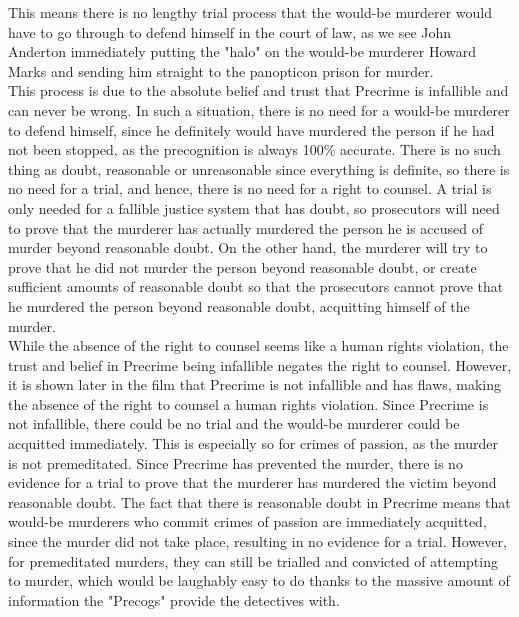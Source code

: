 \documentclass[11pt]{article}
\begin{document}
 \newpage

This means there is no lengthy trial process that the
would-be murderer would have to go through to defend himself
in the court of law, as we see John Anderton immediately putting
the "halo" on the would-be murderer Howard Marks and sending
him straight to the panopticon prison for murder.  \\

This process is due to the absolute belief and trust that Precrime
is infallible and can never be wrong. In such a situation, there
is no need for a would-be murderer to defend himself, since he
definitely would have murdered the person if he had not been stopped,
as the precognition is always 100\% accurate. There is no such thing
as doubt, reasonable or unreasonable since everything is definite,
so there is no need for a trial, and hence, there is no need for a right to counsel.
A trial is only needed for a fallible justice system that has doubt,
so prosecutors will need to prove that the murderer has actually murdered
the person he is accused of murder beyond reasonable doubt.
On the other hand, the murderer will try to prove that he did not murder
the person beyond reasonable doubt, or create sufficient amounts of
reasonable doubt so that the prosecutors cannot prove that he murdered
the person beyond reasonable doubt,
acquitting himself of the murder.  \\

While the absence of the right to counsel seems like a human rights
violation, the trust and belief in Precrime being infallible negates the
right to counsel. However, it is shown later in the film that Precrime
is not infallible and has flaws, making the absence of the
right to counsel a human rights violation. Since Precrime is
not infallible, there could be no trial and the would-be murderer
could be acquitted immediately. This is especially so for
crimes of passion, as the murder is not premeditated.
Since Precrime has prevented the murder, there is no evidence
for a trial to prove that the murderer has murdered the victim
beyond reasonable doubt. The fact that there is reasonable doubt in
Precrime means that would-be murderers who commit crimes of passion
are immediately acquitted, since the murder did not take place,
resulting in no evidence for a trial. However, for premeditated murders,
they can still be trialled and convicted of attempting to murder,
which would be laughably easy to do thanks to the massive amount of
information the "Precogs" provide the detectives with.
\end{document}
